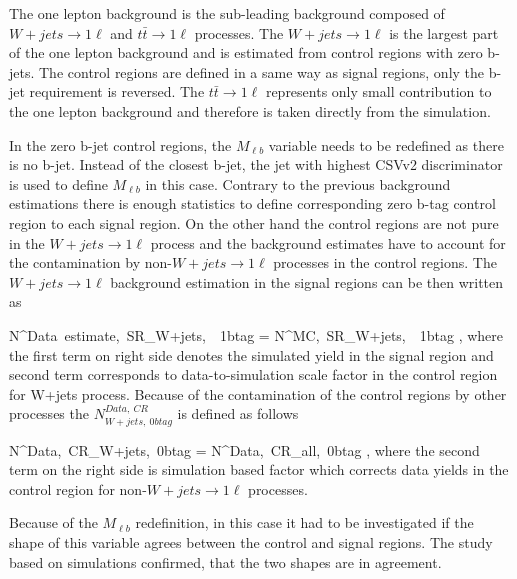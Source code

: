 The  one lepton background is the sub-leading background composed of $W+jets \to 1\ell$  and $t\bar{t} \to 1\ell$ processes. The $W+jets \to 1\ell$  is the largest part of the one lepton background and is estimated from control regions with zero b-jets. The control regions are defined in a same way as signal regions, only the b-jet requirement is reversed. The  $t\bar{t} \to 1\ell$ represents only small contribution to the one lepton background and therefore is taken directly from the simulation.

In the zero b-jet control regions, the $M_{\ell b}$ variable needs to be redefined as there is no b-jet. Instead of the closest b-jet, the jet with highest CSVv2 discriminator is used to define $M_{\ell b}$ in this case. Contrary to the previous background estimations there is enough statistics to define corresponding zero b-tag control region to each signal region. On the other hand the control regions are not pure in the $W+jets \to 1\ell$  process and the background estimates have to account for the contamination by non-$W+jets \to 1\ell$  processes in the control regions. The $W+jets \to 1\ell$  background estimation in the signal regions can be then written as

{
N^{Data~estimate,~SR}_{W+jets,~\geq~1btag}  = N^{MC,~SR}_{W+jets,~\geq~1btag} \times  {},
}
where the first term on right side denotes the simulated yield in the signal region and second term corresponds to data-to-simulation scale factor in the control region for W+jets process. Because of the contamination of the control regions by other processes the $N^{Data,~CR}_{W+jets,~0btag}$ is defined as follows


{
N^{Data,~CR}_{W+jets,~0btag} = N^{Data,~CR}_{all,~0btag} \times {} ,
}
where the second term on the right side is simulation based factor which corrects data yields in the control region for non-$W+jets \to 1\ell$  processes.

Because of the $M_{\ell b}$ redefinition, in this case it had to be investigated if the shape of this variable agrees between the control and signal regions. The study based on simulations confirmed, that the two shapes are in agreement. 

